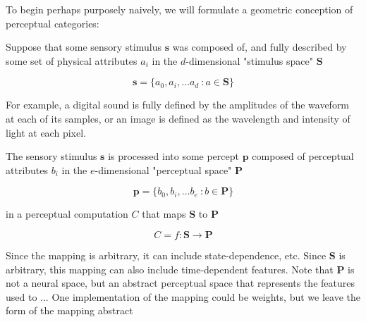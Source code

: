 \begin{multicols}{2}

To begin perhaps purposely naively, we will formulate a geometric conception of perceptual categories:

Suppose that some sensory stimulus $\mathbf{s}$ was composed of, and fully described by some set of physical attributes $a_i$ in the $d$-dimensional "stimulus space" $\mathbf{S}$

\begin{equation}
\mathbf{s} = \{a_0, a_i, \dots a_d\ : a \in \mathbf{S}\}
\end{equation}

For example, a digital sound is fully defined by the amplitudes of the waveform at each of its samples, or an image is defined as the wavelength and intensity of light at each pixel.

The sensory stimulus $\mathbf{s}$ is processed into some percept $\mathbf{p}$ composed of perceptual attributes $b_i$ in the $e$-dimensional "perceptual space" $\mathbf{P}$

\begin{equation}
\mathbf{p} = \{b_0, b_i, \dots b_e\ : b \in \mathbf{P}\}
\end{equation}

in a perceptual computation $C$ that maps $\mathbf{S}$ to $\mathbf{P}$

\begin{equation}
C = f: \mathbf{S} \to \mathbf{P}
\end{equation} 


Since the mapping is arbitrary, it can include state-dependence, etc. Since $\mathbf{S}$ is arbitrary, this mapping can also include time-dependent features. Note that $\mathbf{P}$ is not a neural space, but an abstract perceptual space that represents the features used to ... One implementation of the mapping could be weights, but we leave the form of the mapping abstract


\end{multicols}
